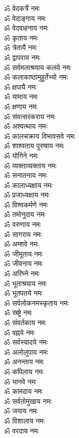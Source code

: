\begin{multicols}{2}
\begin{flushleft}
ॐ वेदकर्त्रे नमः\\
ॐ वेदाङ्गाय नमः\\
ॐ वेदवाहनाय नमः\\
ॐ कृताय नमः\\
ॐ त्रेतायै नमः\\
ॐ द्वापराय नमः\\
ॐ सर्वमलाश्रयाय कलये नमः\\
ॐ कलाकाष्ठामुहूर्तेभ्यो नमः\hfill{}\\
ॐ क्षपायै नमः\\
ॐ यामाय नमः\\
ॐ क्षणाय नमः\\
ॐ संवत्सरकराय नमः\\
ॐ अश्वत्थाय नमः\\
ॐ कालचक्राय विभावसवे नमः\\
ॐ शाश्वताय पुरुषाय नमः\\
ॐ योगिने नमः\\
ॐ व्यक्ताव्यक्ताय नमः\\
ॐ सनातनाय नमः\hfill{}\\
ॐ कालाध्यक्षाय नमः\\
ॐ प्रजाध्यक्षाय नमः\\
ॐ विश्वकर्मणे नमः\\
ॐ तमोनुदाय नमः\\
ॐ वरुणाय नमः\\
ॐ सागराय नमः\\
ॐ अम्शवे नमः\\
ॐ जीमूताय नमः\\
ॐ जीवनाय नमः\\
ॐ अरिघ्ने नमः\hfill{}\\
ॐ भूताश्रयाय नमः\\
ॐ भूतपतये नमः\\
ॐ सर्वलोकनमस्कृताय नमः\\
ॐ स्रष्ट्रे नमः\\
ॐ संवर्तकाय नमः\\
ॐ वह्नये नमः\\
ॐ सर्वस्यादये नमः\\
ॐ अलोलुपाय नमः\\
ॐ अनन्ताय नमः\\
ॐ कपिलाय नमः\hfill{}\\
ॐ भानवे नमः\\
ॐ कामदाय नमः\\
ॐ सर्वतोमुखाय नमः\\
ॐ जयाय नमः\\
ॐ विशालाय नमः\\
ॐ वरदाय नमः\\

\end{flushleft}
\end{multicols}
